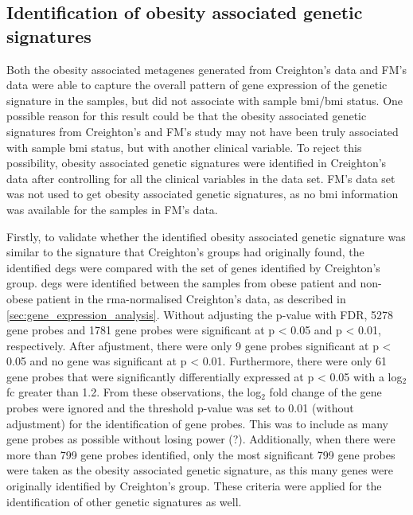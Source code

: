 \subsection{Identification of obesity associated genetic signatures}
\label{sub:identification_of_obesity_associated_genetic_signatures}

Both the obesity associated metagenes generated from Creighton's data and FM's data were able to capture the overall pattern of gene expression of the genetic signature in the samples, but did not associate with sample \gls{bmi}/\gls{bmi} status.
One possible reason for this result could be that the obesity associated genetic signatures from Creighton's and FM's study may not have been truly associated with sample \gls{bmi} status, but with another clinical variable.
To reject this possibility, obesity associated genetic signatures were identified in Creighton's data after controlling for all the clinical variables in the data set.
FM's data set was not used to get obesity associated genetic signatures, as no \gls{bmi} information was available for the samples in FM's data.

Firstly, to validate whether the identified obesity associated genetic signature was similar to the signature that Creighton's groups had originally found, the identified \glspl{deg} were compared with the set of genes identified by Creighton's group.
\glspl{deg}  were identified between the samples from obese patient and non-obese patient in the \gls{rma}-normalised Creighton's data, as described in \cref{sec:gene_expression_analysis}.
Without adjusting the p-value with FDR, 5278 gene probes and 1781 gene probes were significant at p \textless{} 0.05 and p \textless{} 0.01, respectively.
After afjustment, there were only 9 gene probes significant at p \textless{} 0.05 and no gene was significant at p \textless{} 0.01.
Furthermore, there were only 61 gene probes that were significantly differentially expressed at p \textless{} 0.05 with a log$_2$ \gls{fc} greater than 1.2.
From these observations, the log$_2$ fold change of the gene probes were ignored and the threshold p-value was set to 0.01 (without adjustment) for the identification of gene probes.
This was to include as many gene probes as possible without losing power (?).
Additionally, when there were more than 799 gene probes identified, only the most significant 799 gene probes were taken as the obesity associated genetic signature, as this many genes were originally identified by Creighton's group.
These criteria were applied for the identification of other genetic signatures as well.

